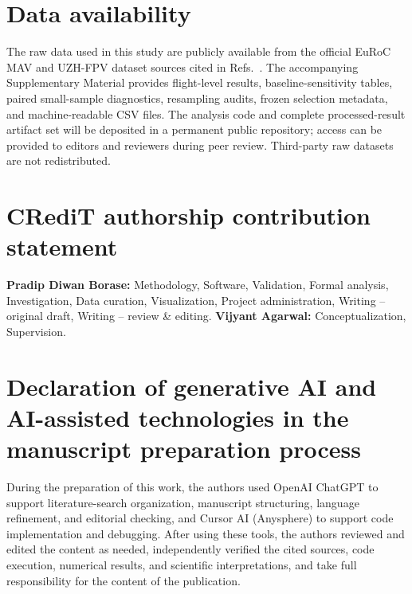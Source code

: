 \documentclass[preprint,12pt]{elsarticle}
\begin{document}
\section*{Data availability}
The raw data used in this study are publicly available from the official EuRoC MAV and UZH-FPV dataset sources cited in Refs.~\cite{Burri2016EuRoC,Delmerico2019UZHFPV}. The accompanying Supplementary Material provides flight-level results, baseline-sensitivity tables, paired small-sample diagnostics, resampling audits, frozen selection metadata, and machine-readable CSV files. The analysis code and complete processed-result artifact set will be deposited in a permanent public repository; access can be provided to editors and reviewers during peer review. Third-party raw datasets are not redistributed.

\section*{CRediT authorship contribution statement}
\textbf{Pradip Diwan Borase:} Methodology, Software, Validation, Formal analysis, Investigation, Data curation, Visualization, Project administration, Writing -- original draft, Writing -- review \& editing. \textbf{Vijyant Agarwal:} Conceptualization, Supervision.

\section*{Declaration of generative AI and AI-assisted technologies in the manuscript preparation process}
During the preparation of this work, the authors used OpenAI ChatGPT to support literature-search organization, manuscript structuring, language refinement, and editorial checking, and Cursor AI (Anysphere) to support code implementation and debugging. After using these tools, the authors reviewed and edited the content as needed, independently verified the cited sources, code execution, numerical results, and scientific interpretations, and take full responsibility for the content of the publication.




\end{document}
